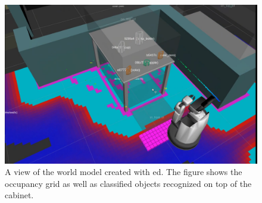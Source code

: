\begin{figure}[h]
\centering
	\includegraphics[width = 0.8\linewidth]{Figures/ed_segmentation_hsr}
	\caption{A view of the world model created with \acrshort{ed}. The figure shows the occupancy grid as well as classified objects recognized on top of the cabinet.}
	\label{fig:ed_segmentation}
\end{figure}
